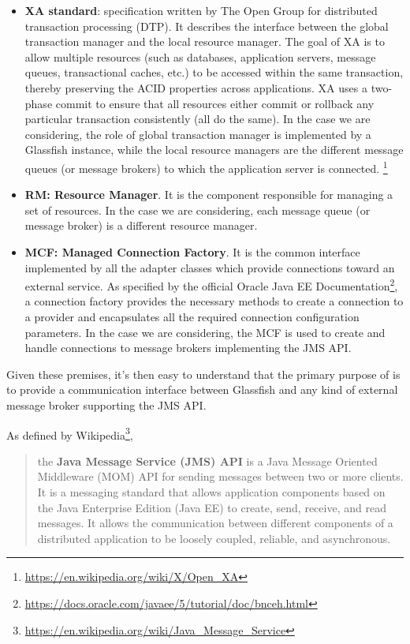 \begin{itemize}
	\item \textbf{XA standard}: specification written by The Open Group for distributed transaction processing (DTP). It describes the interface between the global transaction manager and the local resource manager. The goal of XA is to allow multiple resources (such as databases, application servers, message queues, transactional caches, etc.) to be accessed within the same transaction, thereby preserving the ACID properties across applications. XA uses a two-phase commit to ensure that all resources either commit or rollback any particular transaction consistently (all do the same). In the case we are considering, the role of global transaction manager is implemented by a Glassfish instance, while the local resource managers are the different message queues (or message brokers) to which the application server is connected. \footnote{\url{https://en.wikipedia.org/wiki/X/Open_XA}}
	\item \textbf{RM: Resource Manager}. It is the component responsible for managing a set of resources. In the case we are considering, each message queue (or message broker) is a different resource manager. 
	\item \textbf{MCF: Managed Connection Factory}. It is the common interface implemented by all the adapter classes which provide connections toward an external service. As specified by the official Oracle Java EE Documentation\footnote{\url{https://docs.oracle.com/javaee/5/tutorial/doc/bnceh.html}}, a connection factory provides the necessary methods to create a connection to a provider and encapsulates all the required connection configuration parameters. In the case we are considering, the MCF is used to create and handle connections to message brokers implementing the JMS API.
\end{itemize}

Given these premises, it's then easy to understand that the primary purpose of  is to provide a communication interface between Glassfish and any kind of external message broker supporting the JMS API.  

As defined by Wikipedia\footnote{\url{https://en.wikipedia.org/wiki/Java_Message_Service}},
\begin{quote}the \textbf{Java Message Service (JMS) API} is a Java Message Oriented Middleware (MOM) API for sending messages between two or more clients. It is a messaging standard that allows application components based on the Java Enterprise Edition (Java EE) to create, send, receive, and read messages. It allows the communication between different components of a distributed application to be loosely coupled, reliable, and asynchronous.
\end{quote}


